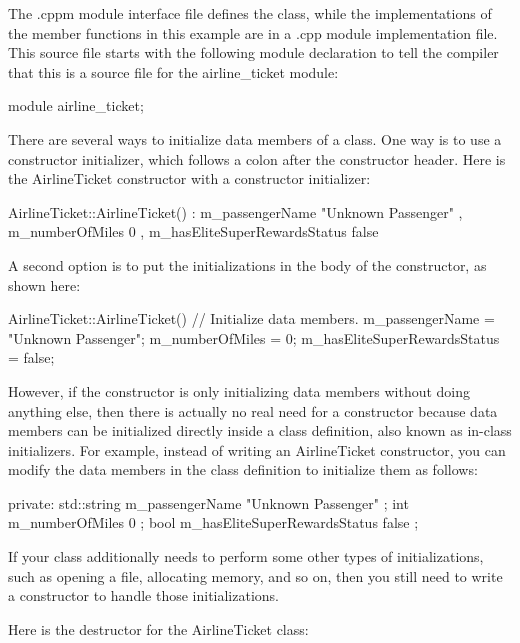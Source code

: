 The .cppm module interface file defines the class, while the implementations of the member functions in this example are in a .cpp module implementation file. This source file starts with the following module declaration to tell the compiler that this is a source file for the airline\_ticket module:

\begin{cpp}
module airline_ticket;
\end{cpp}

There are several ways to initialize data members of a class. One way is to use a constructor initializer, which follows a colon after the constructor header. Here is the AirlineTicket constructor with a constructor initializer:

\begin{cpp}
AirlineTicket::AirlineTicket()
    : m_passengerName { "Unknown Passenger" }
    , m_numberOfMiles { 0 }
    , m_hasEliteSuperRewardsStatus { false }
{}
\end{cpp}

A second option is to put the initializations in the body of the constructor, as shown here:

\begin{cpp}
AirlineTicket::AirlineTicket()
{
    // Initialize data members.
    m_passengerName = "Unknown Passenger";
    m_numberOfMiles = 0;
    m_hasEliteSuperRewardsStatus = false;
}
\end{cpp}

However, if the constructor is only initializing data members without doing anything else, then there is actually no real need for a constructor because data members can be initialized directly inside a class definition, also known as in-class initializers. For example, instead of writing an AirlineTicket constructor, you can modify the data members in the class definition to initialize them as follows:

\begin{cpp}
private:
    std::string m_passengerName { "Unknown Passenger" };
    int m_numberOfMiles { 0 };
    bool m_hasEliteSuperRewardsStatus { false };
\end{cpp}

If your class additionally needs to perform some other types of initializations, such as opening a file, allocating memory, and so on, then you still need to write a constructor to handle those initializations.

Here is the destructor for the AirlineTicket class:

